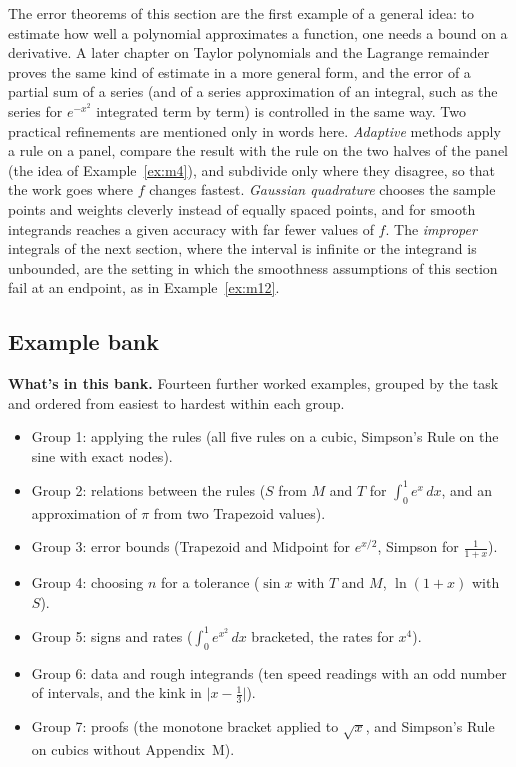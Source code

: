 \documentclass[11pt]{article}
\begin{document}
The error theorems of this section are the first example of a general idea: to estimate how well a polynomial approximates a function, one needs a bound on a derivative. A later chapter on Taylor polynomials and the Lagrange remainder proves the same kind of estimate in a more general form, and the error of a partial sum of a series (and of a series approximation of an integral, such as the series for $e^{-x^2}$ integrated term by term) is controlled in the same way. Two practical refinements are mentioned only in words here. \emph{Adaptive} methods apply a rule on a panel, compare the result with the rule on the two halves of the panel (the idea of Example~\ref{ex:m4}), and subdivide only where they disagree, so that the work goes where $f$ changes fastest. \emph{Gaussian quadrature} chooses the sample points and weights cleverly instead of equally spaced points, and for smooth integrands reaches a given accuracy with far fewer values of $f$. The \emph{improper} integrals of the next section, where the interval is infinite or the integrand is unbounded, are the setting in which the smoothness assumptions of this section fail at an endpoint, as in Example~\ref{ex:m12}.

\subsection*{Example bank}

\textbf{What's in this bank.} Fourteen further worked examples, grouped by the task and ordered from easiest to hardest within each group.
\begin{itemize}[nosep]
  \item Group 1: applying the rules (all five rules on a cubic, Simpson's Rule on the sine with exact nodes).
  \item Group 2: relations between the rules ($S$ from $M$ and $T$ for $\int_0^1e^x\,dx$, and an approximation of $\pi$ from two Trapezoid values).
  \item Group 3: error bounds (Trapezoid and Midpoint for $e^{x/2}$, Simpson for $\frac1{1+x}$).
  \item Group 4: choosing $n$ for a tolerance ($\sin x$ with $T$ and $M$, $\ln(1+x)$ with $S$).
  \item Group 5: signs and rates ($\int_0^1e^{x^2}\,dx$ bracketed, the rates for $x^4$).
  \item Group 6: data and rough integrands (ten speed readings with an odd number of intervals, and the kink in $\lvert x-\frac13\rvert$).
  \item Group 7: proofs (the monotone bracket applied to $\sqrt x$, and Simpson's Rule on cubics without Appendix~M).
\end{itemize}
\end{document}
